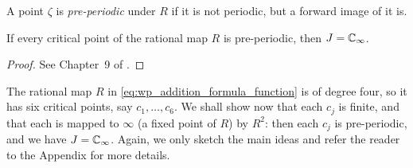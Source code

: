 \begin{definition}
    \label{def:preperiodic_point}
    A point $\zeta$ is \emph{pre-periodic} under $R$ if it is not periodic, but
    a forward image of it is.
\end{definition}

\begin{theorem}[$\forall z \in C$, $z$ pre-periodic $\implies J = \ExtC$]
    \label{thm:all_critical_points_preperiodic_implies_J_is_ExtC}
    If every critical point of the rational map $R$ is pre-periodic, then $J =
    \mathbb{C}_\infty$.
\end{theorem}
\begin{proof}
    See Chapter~9 of \cite{Beardon1991}.
\end{proof}

\begin{example*}[Continuation]
    The rational map $R$ in \eqref{eq:wp_addition_formula_function} is of degree
    four, so it has six critical points, say $c_1, \dots, c_6$. We shall show
    now that each $c_j$ is finite, and that each is mapped to $\infty$ (a fixed
    point of $R$) by $R^2$: then each $c_j$ is pre-periodic, and we have $J =
    \mathbb{C}_\infty$. Again, we only sketch the main ideas and refer the reader to the
    Appendix for more details.


\end{example*}
